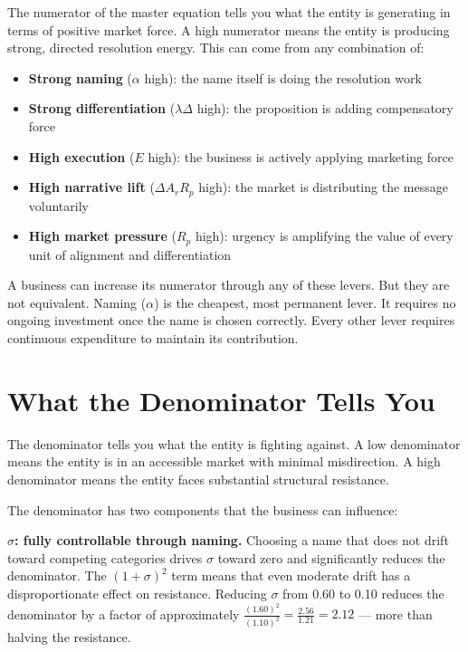 \documentclass[12pt, openany]{book}
\theoremstyle{thmstyle}
\theoremstyle{defstyle}
\begin{document}
The numerator of the master equation tells you what the entity is generating in terms of positive market force. A high numerator means the entity is producing strong, directed resolution energy. This can come from any combination of:

\begin{itemize}[leftmargin=1.5em]
  \item \textbf{Strong naming} ($\alpha$ high): the name itself is doing the resolution work
  \item \textbf{Strong differentiation} ($\lambda\Delta$ high): the proposition is adding compensatory force
  \item \textbf{High execution} ($E$ high): the business is actively applying marketing force
  \item \textbf{High narrative lift} ($\Delta A_r R_p$ high): the market is distributing the message voluntarily
  \item \textbf{High market pressure} ($R_p$ high): urgency is amplifying the value of every unit of alignment and differentiation
\end{itemize}

A business can increase its numerator through any of these levers. But they are not equivalent. Naming ($\alpha$) is the cheapest, most permanent lever. It requires no ongoing investment once the name is chosen correctly. Every other lever requires continuous expenditure to maintain its contribution.

\section{What the Denominator Tells You}

The denominator tells you what the entity is fighting against. A low denominator means the entity is in an accessible market with minimal misdirection. A high denominator means the entity faces substantial structural resistance.

The denominator has two components that the business can influence:

\textbf{$\sigma$: fully controllable through naming.} Choosing a name that does not drift toward competing categories drives $\sigma$ toward zero and significantly reduces the denominator. The $(1+\sigma)^2$ term means that even moderate drift has a disproportionate effect on resistance. Reducing $\sigma$ from 0.60 to 0.10 reduces the denominator by a factor of approximately $\frac{(1.60)^2}{(1.10)^2} = \frac{2.56}{1.21} = 2.12$ --- more than halving the resistance.
\end{document}
